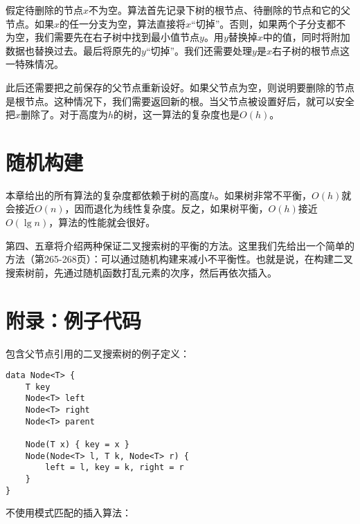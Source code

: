 \documentclass[b5paper]{ctexart}
\begin{document}
假定待删除的节点$x$不为空。算法首先记录下树的根节点、待删除的节点和它的父节点。如果$x$的任一分支为空，算法直接将$x$“切掉”。否则，如果两个子分支都不为空，我们需要先在右子树中找到最小值节点$y$。用$y$替换掉$x$中的值，同时将附加数据也替换过去。最后将原先的$y$“切掉”。我们还需要处理$y$是$x$右子树的根节点这一特殊情况。

此后还需要把之前保存的父节点重新设好。如果父节点为空，则说明要删除的节点是根节点。这种情况下，我们需要返回新的根。当父节点被设置好后，就可以安全把$x$删除了。对于高度为$h$的树，这一算法的复杂度也是$O(h)$。

\begin{Exercise}
\end{Exercise}

\section{随机构建}

本章给出的所有算法的复杂度都依赖于树的高度$h$。如果树非常不平衡，$O(h)$就会接近$O(n)$，因而退化为线性复杂度。反之，如果树平衡，$O(h)$接近$O(\lg n)$，算法的性能就会很好。

第四、五章将介绍两种保证二叉搜索树的平衡的方法。这里我们先给出一个简单的方法（\cite{CLRS}第265-268页）：可以通过随机构建来减小不平衡性。也就是说，在构建二叉搜索树前，先通过随机函数打乱元素的次序，然后再依次插入。

\begin{Exercise}
\end{Exercise}

\section{附录：例子代码}

包含父节点引用的二叉搜索树的例子定义：

\lstset{language=Bourbaki, frame=single}
\begin{lstlisting}
data Node<T> {
    T key
    Node<T> left
    Node<T> right
    Node<T> parent

    Node(T x) { key = x }
    Node(Node<T> l, T k, Node<T> r) {
        left = l, key = k, right = r
    }
}
\end{lstlisting}

不使用模式匹配的插入算法：
\end{document}
